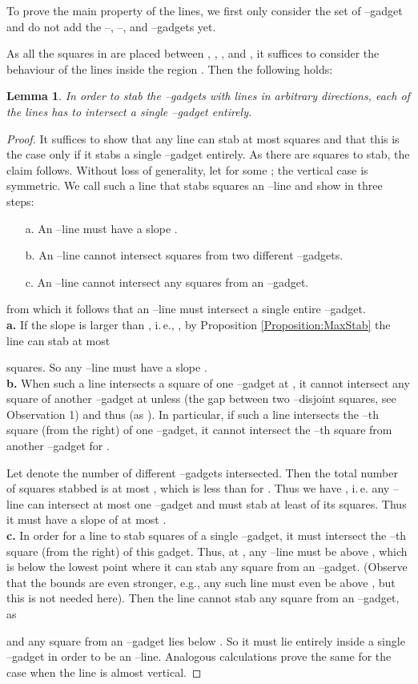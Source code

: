\documentclass[12pt]{article}
\newtheorem{lemma}[definition]{Lemma}
\begin{document}
To prove the main property of the lines, we first only consider the set of  --gadget and do not add the --, --, and --gadgets yet. 

As all the squares in  are placed between , , , and , it suffices to consider the behaviour of the lines inside the region .
Then the following holds:
\begin{lemma}\label{Lemma:SlopeLemma} In order to stab the  --gadgets with  lines in arbitrary directions, each of the lines has to intersect a single --gadget entirely.
\end{lemma}
\begin{proof} 
It suffices to show that any line can stab at most  squares and that this is the case only if it stabs a single --gadget entirely. As there are  squares to stab, the claim follows. Without loss of generality, let  for some ; the vertical case is symmetric. We call such a line that stabs  squares an --line and show in three steps:
\begin{enumerate}
	\item[a.] An --line must have a slope .
	\item[b.] An --line cannot intersect squares from two different --gadgets.
	\item[c.] An --line cannot intersect any squares from an --gadget.
\end{enumerate}
from which it follows that an --line must intersect a single entire --gadget.
\medskip
\noindent
\\
\textbf{a.} If the slope  is larger than , i.\,e., , by Proposition \ref{Proposition:MaxStab} the line can stab at most

squares. So any --line must have a slope .
\medskip
\noindent
\\
\textbf{b.} When such a line intersects a square of one --gadget at , it cannot intersect any square of another --gadget at  unless  (the gap between two --disjoint squares, see Observation 1) and thus  (as ). In particular, if such a line intersects the --th square (from the right) of one --gadget, it cannot intersect the --th square from another --gadget for .

Let  denote the number of different --gadgets intersected. Then the total number of squares stabbed is at most , which is less than  for . Thus we have , i.\,e. any --line can intersect at most one --gadget and must stab at least  of its squares. Thus it must have a slope of at most .
\medskip
\noindent
\\
\textbf{c.} In order for a line to stab  squares of a single --gadget, it must intersect the --th square (from the right) of this gadget. Thus, at , any --line must be above , which is below the lowest point where it can stab any square from an --gadget. (Observe that the bounds are even stronger, e.g., any such line must even be above , but this is not needed here).  Then the line cannot stab any square from an --gadget, as 

and any square from an --gadget lies below . So it must lie entirely inside a single --gadget in order to be an --line. 
Analogous calculations prove the same for the case  when the line is almost vertical.
\end{proof}
\end{document}

